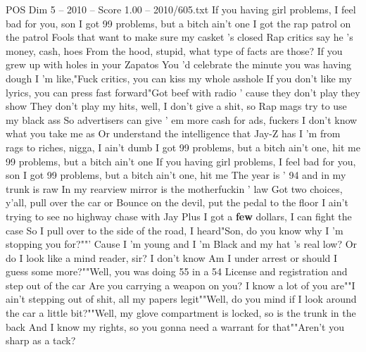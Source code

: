 \begin{textsample}{POS Dim 5 – 2010 – Score 1.00 – 2010/605.txt}  \label{ex:f5_pos_038}
If you having girl problems, I feel bad for you, son I got 99 problems, but a bitch ain't one I got the rap patrol on the patrol Fools that want to make sure my casket 's closed Rap critics say he 's money, cash, hoes From the hood, stupid, what type of facts are those?
If you grew up with holes in your Zapatos You 'd celebrate the minute you was having dough I 'm like,"Fuck critics, you can kiss my whole asshole If you don't like my lyrics, you can press fast forward"Got beef with radio ' cause they don't play they show They don't play my hits, well, I don't give a shit, so Rap mags try to use my black ass So advertisers can give ' em more cash for ads, fuckers I don't know what you take me as Or understand the intelligence that Jay-Z has I 'm from rags to riches, nigga, I ain't dumb I got 99 problems, but a bitch ain't one, hit me 99 problems, but a bitch ain't one If you having girl problems, I feel bad for you, son I got 99 problems, but a bitch ain't one, hit me The year is ' 94 and in my trunk is raw In my rearview mirror is the motherfuckin ' law Got two choices, y'all, pull over the car or Bounce on the devil, put the pedal to the floor I ain't trying to see no highway chase with Jay Plus I got a \textbf{few} dollars, I can fight the case So I pull over to the side of the road, I heard"Son, do you know why I 'm stopping you for?""' Cause I 'm young and I 'm Black and my hat 's real low?
Or do I look like a mind reader, sir?
I don't know Am I under arrest or should I guess some more?""Well, you was doing 55 in a 54 License and registration and step out of the car Are you carrying a weapon on you?
I know a lot of you are""I ain't stepping out of shit, all my papers legit""Well, do you mind if I look around the car a little bit?""Well, my glove compartment is locked, so is the trunk in the back And I know my rights, so you gonna need a warrant for that""Aren't you sharp as a tack?

\end{textsample}
